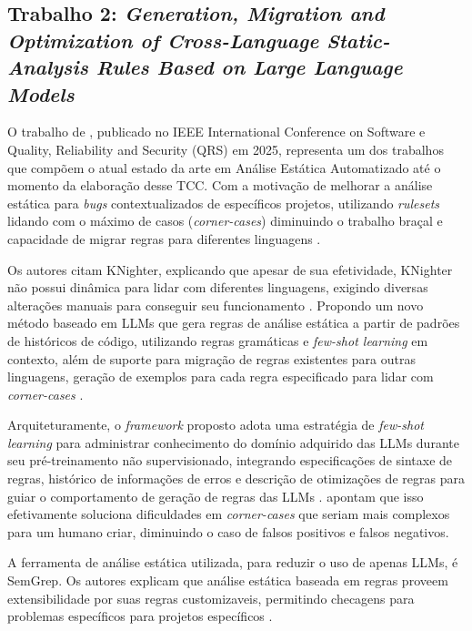 \documentclass[
    12pt,                %
    openright,           %
    oneside,             %
    a4paper,             %
    english,             %
    brazil               %
]{abntex2}
\begin{document}
\subsection{Trabalho 2: \textit{Generation, Migration and Optimization of Cross-Language Static-Analysis Rules Based on Large Language Models} \cite{hou2025generation}}
\par
O trabalho de , publicado no IEEE International Conference on Software e Quality, Reliability and Security (QRS) em 2025, representa um dos trabalhos que compõem o atual estado da arte em Análise Estática Automatizado até o momento da elaboração desse TCC.
Com a motivação de melhorar a análise estática para \textit{bugs} contextualizados de específicos projetos, utilizando \textit{rulesets} lidando com o máximo de casos (\textit{corner-cases}) diminuindo o trabalho braçal e capacidade de migrar regras para diferentes linguagens \cite{hou2025generation}.
\par
Os autores citam KNighter, explicando que apesar de sua efetividade, KNighter não possui dinâmica para lidar com diferentes linguagens, exigindo diversas alterações manuais para conseguir seu funcionamento \cite{hou2025generation}.
Propondo um novo método baseado em LLMs que gera regras de análise estática a partir de padrões de históricos de código, utilizando regras gramáticas e \textit{few-shot learning} em contexto, além de suporte para migração de regras existentes para outras linguagens, geração de exemplos para cada regra especificado para lidar com \textit{corner-cases} \cite{hou2025generation}.
\par
Arquiteturamente, o \textit{framework} proposto adota uma estratégia de \textit{few-shot learning} para administrar conhecimento do domínio adquirido das LLMs durante seu pré-treinamento não supervisionado, integrando especificações de sintaxe de regras, histórico de informações de erros e descrição de otimizações de regras para guiar o comportamento de geração de regras das LLMs \cite{hou2025generation}.
 apontam que isso efetivamente soluciona dificuldades em \textit{corner-cases} que seriam mais complexos para um humano criar, diminuindo o caso de falsos positivos e falsos negativos.
\par
A ferramenta de análise estática utilizada, para reduzir o uso de apenas LLMs, é SemGrep.
Os autores explicam que análise estática baseada em regras proveem extensibilidade por suas regras customizaveis, permitindo checagens para problemas específicos para projetos específicos \cite{hou2025generation}.
\end{document}
